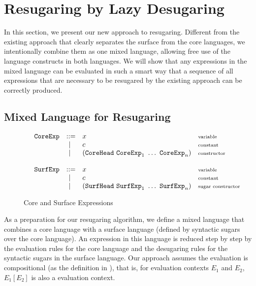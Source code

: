 
\section{Resugaring by Lazy Desugaring}
\label{sec3}

In this section, we present our new approach to resugaring. Different from the existing approach that clearly separates the surface from the core languages, we intentionally combine them as one mixed language, allowing free use of the language constructs in both languages. We will show that any expressions in the mixed language can be evaluated in such a smart way that a sequence of all expressions that are necessary to be resugared by the existing approach can be correctly produced.

\subsection{Mixed Language for Resugaring}

\begin{figure}[t]
\begin{flushleft}
{\footnotesize
\[
\begin{array}{lllll}
 &\mbox{\tt CoreExp} &::=& x  & \mbox{{\scriptsize variable}}\\
       &&~|~& c  & \mbox{{\scriptsize constant}}\\
			 &&~|~& (\mbox{\tt CoreHead}~\mbox{\tt CoreExp}_1~\ldots~\mbox{\tt CoreExp}_n) & \mbox{{\scriptsize constructor}}\\
\\
 &\mbox{\tt SurfExp} &::=& x  & \mbox{{\scriptsize variable}}\\
       &&~|~& c  & \mbox{{\scriptsize constant}}\\
				 &&~|~& (\mbox{\tt SurfHead}~\mbox{\tt SurfExp}_1~\ldots~\mbox{\tt SurfExp}_n) & \mbox{{\scriptsize sugar constructor}}\\
\end{array}
\]
}
\end{flushleft}


	\caption{Core and Surface Expressions \todo{}}
	\label{fig:expression}
\end{figure}

As a preparation for our resugaring algorithm, we define a mixed language that combines a core language with a surface language (defined by syntactic sugars over the core language). An expression in this language is reduced step by step by the evaluation rules for the core language and the desugaring rules for the syntactic sugars in the surface language. Our approach assumes the evaluation is  compositional (as the definition in \cite{hygienic}), that is, for evaluation contexts $E_1$ and $E_2$, $E_1[E_2]$ is also a evaluation context.
